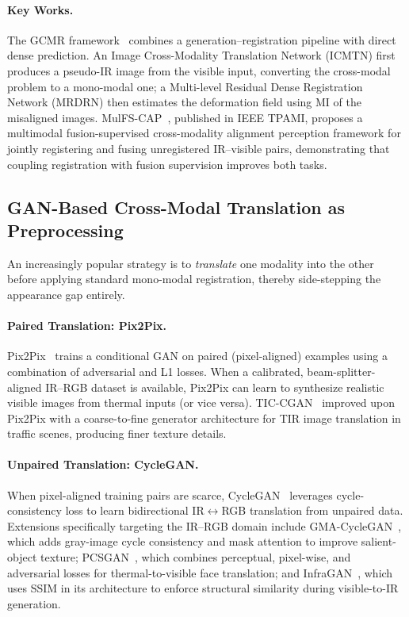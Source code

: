 \paragraph{Key Works.}
The GCMR framework~\cite{gcmr2023} combines a generation--registration pipeline
with direct dense prediction. An Image Cross-Modality Translation Network
(ICMTN) first produces a pseudo-IR image from the visible input, converting
the cross-modal problem to a mono-modal one; a Multi-level Residual Dense
Registration Network (MRDRN) then estimates the deformation field using MI
of the misaligned images. MulFS-CAP~\cite{mulfscap2025}, published in IEEE
TPAMI, proposes a multimodal fusion-supervised cross-modality alignment
perception framework for jointly registering and fusing unregistered IR--visible
pairs, demonstrating that coupling registration with fusion supervision improves
both tasks.

\subsection{GAN-Based Cross-Modal Translation as Preprocessing}
\label{subsec:gan-translation}

An increasingly popular strategy is to \emph{translate} one modality into
the other before applying standard mono-modal registration, thereby
side-stepping the appearance gap entirely.

\paragraph{Paired Translation: Pix2Pix.}
Pix2Pix~\cite{isola2017image} trains a conditional GAN on paired
(pixel-aligned) examples using a combination of adversarial and L1 losses. When
a calibrated, beam-splitter-aligned IR--RGB dataset is available, Pix2Pix can
learn to synthesize realistic visible images from thermal inputs (or vice
versa). TIC-CGAN~\cite{tic-cgan2019} improved upon Pix2Pix with a
coarse-to-fine generator architecture for TIR image translation in traffic
scenes, producing finer texture details.

\paragraph{Unpaired Translation: CycleGAN.}
When pixel-aligned training pairs are scarce, CycleGAN~\cite{zhu2017unpaired}
leverages cycle-consistency loss to learn bidirectional IR$\leftrightarrow$RGB
translation from unpaired data. Extensions specifically targeting the IR--RGB
domain include GMA-CycleGAN~\cite{gma-cyclegan2023}, which adds gray-image
cycle consistency and mask attention to improve salient-object texture;
PCSGAN~\cite{pcsgan2020}, which combines perceptual, pixel-wise, and
adversarial losses for thermal-to-visible face translation; and
InfraGAN~\cite{infragan2022}, which uses SSIM in its architecture to enforce
structural similarity during visible-to-IR generation.


